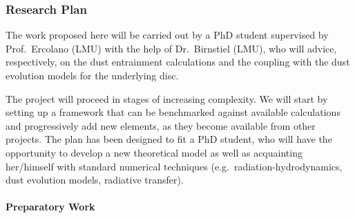\documentclass[10pt,fleqn,twoside]{article}
\begin{document}
\subsubsection{Research Plan} 

The work proposed here will be carried out by a PhD student supervised by
Prof.\ Ercolano (LMU) with the help of Dr.\ Birnstiel (LMU), who will
advice, respectively, on the dust entrainment calculations and the 
coupling with the dust evolution models for the underlying disc. 

The project will proceed in stages of increasing complexity. We will start
by setting up a framework that can be benchmarked against available
calculations and progressively add new elements, as they become
available from other projects. The plan has been designed to fit a
PhD student, who will have the opportunity to develop a new theoretical
model as well as acquainting her/himself with standard numerical
techniques (e.g.\ radiation-hydrodynamics, dust evolution models,
radiative transfer). 


\paragraph{Preparatory Work}
\end{document}
